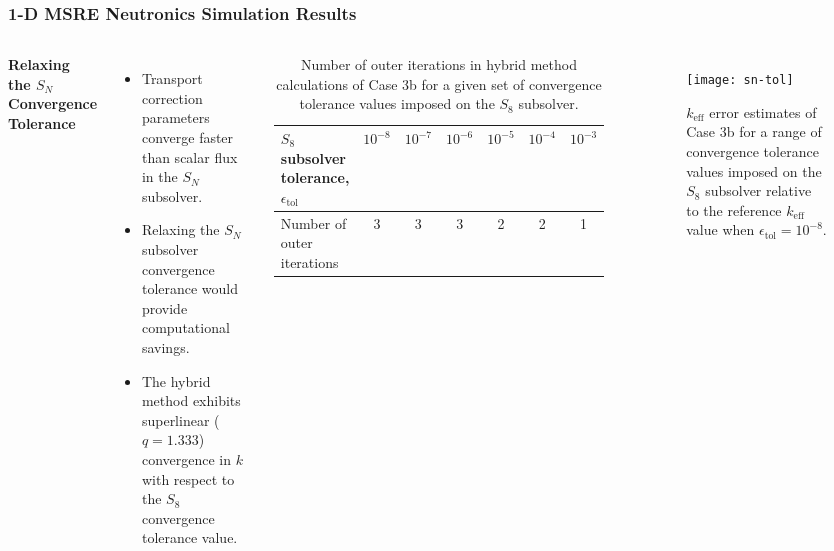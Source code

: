 \begin{frame}
  \frametitle{1-D MSRE Neutronics Simulation Results}
  \begin{columns}
    \column{7cm}
    \textbf{Relaxing the $S_N$ Convergence Tolerance}
    \begin{itemize}
      \item Transport correction parameters converge faster than scalar flux in the $S_N$ subsolver.
      \item Relaxing the $S_N$ subsolver convergence tolerance would provide computational savings.
      \item The hybrid method exhibits superlinear ($q=1.333$) convergence in $k$ with respect to
        the $S_8$ convergence tolerance value.
    \end{itemize}
    \begin{table}[h]
      \centering
      \caption{Number of outer iterations in hybrid method calculations of Case 3b for a given set of
      convergence tolerance values imposed on the $S_8$ subsolver.}
      \small
      \setlength\tabcolsep{2pt}
      \begin{tabular}{l S S S S S S}
        \toprule
        $S_8$ subsolver tolerance, $\epsilon_\text{tol}$ & {$10^{-8}$} & {$10^{-7}$} & {$10^{-6}$} & {$10^{-5}$} & {$10^{-4}$} & {$10^{-3}$} \\
        \midrule
        Number of outer iterations & 3 & 3 & 3 & 2 & 2 & 1 \\
        \bottomrule
      \end{tabular}
      \label{table:sn-tol}
    \end{table}
    \column{4cm}
    \begin{figure}[h]
      \centering
      \texttt{[image: sn-tol]}
      \caption{$k_\text{eff}$ error estimates of Case 3b for a range of convergence tolerance values
      imposed on the $S_8$ subsolver relative to the reference $k_\text{eff}$ value when
      $\epsilon_\text{tol}=10^{-8}$.}
      \label{fig:sn-tol}
    \end{figure}
  \end{columns}
\end{frame}
